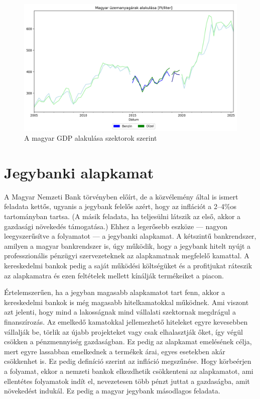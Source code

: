 \begin{figure}[htbp]
    \centering
    \includegraphics[width=1\textwidth, height=0.8\textheight, keepaspectratio]{../figures/petrol_prices.png}
    \caption{A magyar GDP alakulása szektorok szerint}\label{fig:petrol_prices}
\end{figure}

\section{Jegybanki alapkamat}

A Magyar Nemzeti Bank törvényben előírt, de a közvélemény által is ismert feladata kettős, ugyanis
a jegybank felelős azért, hogy az inflációt a 2--4\%\-os tartományban tartsa. (A másik feladata, ha
teljesülni látszik az első, akkor a gazdasági növekedés támogatása.) Ehhez a legerősebb eszköze ---
nagyon leegyszerűsítve a folyamatot --- a jegybanki alapkamat. A kétszintű bankrendszer, amilyen a
magyar bankrendszer is, úgy működik, hogy a jegybank hitelt nyújt a professzionális pénzügyi
szervezeteknek az alapkamatnak megfelelő kamattal. A kereskedelmi bankok pedig a saját működési
költségüket és a profitjukat ráteszik az alapkamatra és ezen feltételek mellett kínálják
termékeiket a piacon.

Értelemszerűen, ha a jegyban magasabb alapkamatot tart fenn, akkor a kereskedelmi bankok is még
magasabb hitelkamatokkal működnek. Ami viszont azt jelenti, hogy mind a lakosságnak mind vállalati
szektornak megdrágul a finanszírozás. Az emelkedő kamatokkal jellemezhető hiteleket egyre kevesebben
vállalják be, törlik az újabb projekteket vagy csak elhalasztják őket, így végül csökken a
pénzmennyiség gazdaságban. Ez pedig az alapkamat emelésének célja, mert egyre lassabban emelkednek a
termékek árai, egyes esetekben akár csökkenhet is. Ez pedig definíció szerint az infláció
megszűnése. Hogy körbeérjen a folyamat, ekkor a nemzeti bankok elkezdhetik csökkenteni az
alapkamatot, ami ellentétes folyamatok indít el, nevezetesen több pénzt juttat a gazdaságba,
amit növekedést indukál. Ez pedig a magyar jegybank másodlagos feladata.

